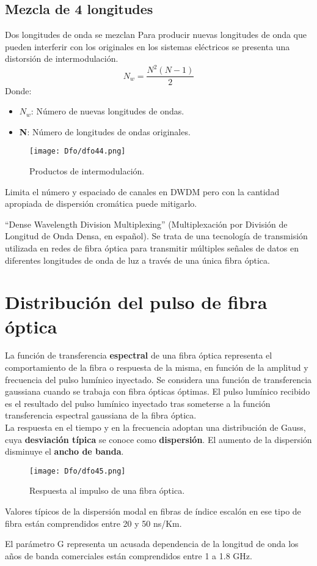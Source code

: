 \documentclass[
	12pt, %
	fleqn, %
	a4paper, %
	oneside, %
]{LegrandOrangeBook}
\begin{document}
\subsection{Mezcla de 4 longitudes}
Dos longitudes de onda se mezclan Para producir nuevas longitudes de onda que pueden interferir con los originales en los sistemas eléctricos se presenta una distorsión de intermodulación.
\begin{equation}
N_w=\frac{N^2(N-1)}{2}
\end{equation}
Donde:
\begin{itemize}
\item $N_w$: Número de nuevas longitudes de ondas.
\item \textbf{N}: Número de longitudes de ondas originales.
\end{itemize}
\begin{figure}[H]
\centering
\texttt{[image: Dfo/dfo44.png]}
\caption{Productos de intermodulación.}
\end{figure}
Limita el número y espaciado de canales en DWDM pero con la cantidad apropiada de dispersión cromática puede mitigarlo.
\begin{vocabulary}[DWDM]
``Dense Wavelength Division Multiplexing'' (Multiplexación por División de Longitud de Onda Densa, en español). Se trata de una tecnología de transmisión utilizada en redes de fibra óptica para transmitir múltiples señales de datos en diferentes longitudes de onda de luz a través de una única fibra óptica.
\end{vocabulary}
\section{Distribución del pulso de fibra óptica}
La función de transferencia \textbf{espectral} de una fibra óptica representa el comportamiento de la fibra o respuesta de la misma, en función de la amplitud y frecuencia del pulso lumínico inyectado. Se considera una función de transferencia gaussiana cuando se trabaja con fibra ópticas óptimas. El pulso lumínico recibido es el resultado del pulso lumínico inyectado tras someterse a la función transferencia espectral gaussiana de la fibra óptica.\\
La respuesta en el tiempo y en la frecuencia adoptan una distribución de Gauss, cuya \textbf{desviación típica} se conoce como \textbf{dispersión}. El aumento de la dispersión disminuye el \textbf{ancho de banda}. 
\begin{figure}[H]
\centering
\texttt{[image: Dfo/dfo45.png]}
\caption{Respuesta al impulso de una fibra óptica.}
\end{figure}
\begin{notation}
Valores típicos de la dispersión modal en fibras de índice escalón en ese tipo de fibra están comprendidos entre 20 y 50 ns/Km.
\end{notation}
\begin{notation}
El parámetro G representa un acusada dependencia de la longitud de onda los años de banda comerciales están comprendidos entre 1 a 1.8 GHz.
\end{notation}
\end{document}
